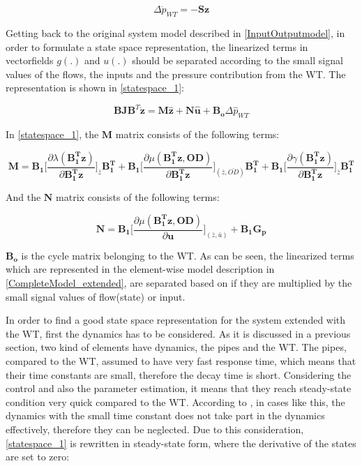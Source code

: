 \begin{equation}
\Delta \dot{p}_{WT} = - \pmb{S} \pmb{z}
 \label{currentlaw_4}
\end{equation}

Getting back to the original system model described in \eqref{InputOutputmodel}, in order to formulate a state space representation, the linearized terms in  vectorfields $g(.)$ and $u(.)$ should be separated according to the small signal values of the flows, the inputs and the pressure contribution from the WT. The representation is shown in \eqref{statespace_1}: 

\begin{equation}
 \pmb{B}\pmb{J {B}}^T \pmb{\dot{z}} = \pmb{M} \pmb{\hat{z}} + \pmb{N} \pmb{\hat{u}} + \pmb{B_o} \Delta \hat{p}_{WT}    
 \label{statespace_1}
\end{equation}

In \eqref{statespace_1}, the $\pmb{M}$ matrix consists of the following terms: 

\begin{equation}
  \pmb{M} = \pmb{B_1} \bigg[ \frac{\partial{\lambda(\pmb{{B_1^{T}}}\pmb{z})}}{{\partial{\pmb{{B_1^{T}}}\pmb{z}}}}   \bigg]_{\bar{z}} \pmb{{B_1^{T}}} +  \pmb{B_1} \bigg[ \frac{\partial{\mu(\pmb{{B_1^{T}}}\pmb{z}, \pmb{OD})}}{{\partial{\pmb{{B_1^{T}}}\pmb{z}}}}  \bigg]_{(\bar{z}, \bar{OD})} \pmb{{B_1^{T}}} +  \pmb{B_1} \bigg[ \frac{\partial{\gamma(\pmb{{B_1^{T}}}\pmb{z})}}{{\partial{\pmb{{B_1^{T}}}\pmb{z}}}}   \bigg]_{\bar{z}} \pmb{{B_1^{T}}}
\label{Amatrix}
\end{equation}

And the $\pmb{N}$ matrix consists of the following terms:

\begin{equation}
  \pmb{N} = \pmb{B_1} \bigg[ \frac{\partial{\mu(\pmb{{B_1^{T}}}\pmb{z}, \pmb{OD})}}{{\partial{\pmb{u}}}}  \bigg]_{(\bar{z}, \bar{u})} + \pmb{B_1}\pmb{G_p}  
\label{Bumatrix}
\end{equation}

$\pmb{B_o}$ is the cycle matrix belonging to the WT. As can be seen, the linearized terms which are represented in the element-wise model description in \eqref{CompleteModel_extended}, are separated based on if they are multiplied by the small signal values of flow(state) or input. 

In order to find a good state space representation for the system extended with the WT, first the dynamics has to be considered. As it is discussed in a previous section, two kind of elements have dynamics, the pipes and the WT. The pipes, compared to the WT, assumed to have very fast response time, which means that their time constants are small, therefore the decay time is short. Considering the control and also the parameter estimation, it means that they reach steady-state condition very quick compared to the WT. According to \todo{[source]}, in cases like this, the dynamics with the small time constant does not take part in the dynamics effectively, therefore they can be neglected. Due to this consideration, \eqref{statespace_1} is rewritten in steady-state form, where the derivative of the states are set to zero:

